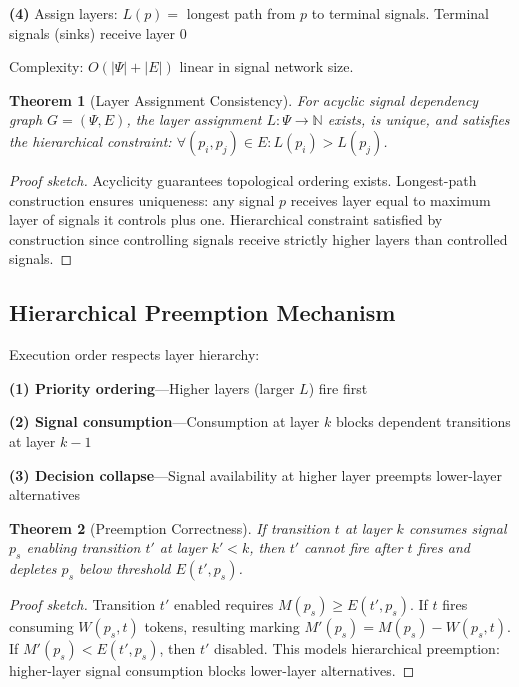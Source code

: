 \documentclass[twocolumn,11pt]{article}
\newtheorem{theorem}{Theorem}
\begin{document}
\vspace{2pt}
\noindent\textbf{(4)} Assign layers: $L(p) = $ longest path from $p$ to terminal signals. Terminal signals (sinks) receive layer 0

\vspace{3pt}
\noindent Complexity: $O(|\Psi| + |E|)$ linear in signal network size.

\begin{theorem}[Layer Assignment Consistency]
For acyclic signal dependency graph $G = (\Psi, E)$, the layer assignment $L: \Psi \to \mathbb{N}$ exists, is unique, and satisfies the hierarchical constraint: $\forall (p_i, p_j) \in E: L(p_i) > L(p_j)$.
\end{theorem}

\begin{proof}[Proof sketch]
Acyclicity guarantees topological ordering exists. Longest-path construction ensures uniqueness: any signal $p$ receives layer equal to maximum layer of signals it controls plus one. Hierarchical constraint satisfied by construction since controlling signals receive strictly higher layers than controlled signals.
\end{proof}

\subsection{Hierarchical Preemption Mechanism}

Execution order respects layer hierarchy:

\noindent\textbf{(1) Priority ordering}---Higher layers (larger $L$) fire first

\vspace{4pt}
\noindent\textbf{(2) Signal consumption}---Consumption at layer $k$ blocks dependent transitions at layer $k-1$

\vspace{4pt}
\noindent\textbf{(3) Decision collapse}---Signal availability at higher layer preempts lower-layer alternatives

\vspace{4pt}
\begin{theorem}[Preemption Correctness]
If transition $t$ at layer $k$ consumes signal $p_s$ enabling transition $t'$ at layer $k' < k$, then $t'$ cannot fire after $t$ fires and depletes $p_s$ below threshold $E(t', p_s)$.
\end{theorem}

\begin{proof}[Proof sketch]
Transition $t'$ enabled requires $M(p_s) \geq E(t', p_s)$. If $t$ fires consuming $W(p_s, t)$ tokens, resulting marking $M'(p_s) = M(p_s) - W(p_s, t)$. If $M'(p_s) < E(t', p_s)$, then $t'$ disabled. This models hierarchical preemption: higher-layer signal consumption blocks lower-layer alternatives.
\end{proof}
\end{document}
